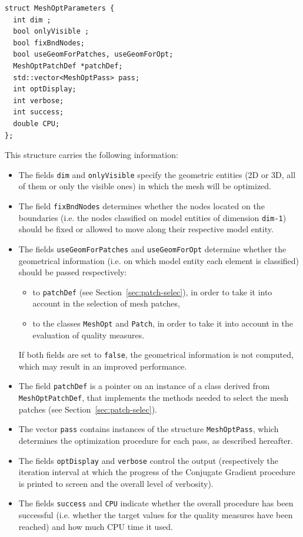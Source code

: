 \documentclass[12pt,a4paper,a4wide]{article}
\begin{document}
\begin{verbatim}
struct MeshOptParameters {
  int dim ;
  bool onlyVisible ;
  bool fixBndNodes;
  bool useGeomForPatches, useGeomForOpt;
  MeshOptPatchDef *patchDef;
  std::vector<MeshOptPass> pass;
  int optDisplay;
  int verbose;
  int success;
  double CPU;
};
\end{verbatim}

This structure carries the following information:
\begin{itemize}
\item The fields \texttt{dim} and \texttt{onlyVisible} specify the
geometric entities (2D or 3D, all of them or only the visible ones)
in which the mesh will be optimized.
\item The field \texttt{fixBndNodes} determines whether the nodes
located on the boundaries (i.e. the nodes classified on model
entities of dimension \texttt{dim-1}) should be fixed or allowed to
move along their respective model entity.
\item The fields \texttt{useGeomForPatches} and \texttt{useGeomForOpt}
determine whether the geometrical information (i.e. on which model
entity each element is classified) should be passed respectively:
\begin{itemize}
\item to \texttt{patchDef} (see Section~\ref{sec:patch-selec}), in
order to take it into account in the selection of mesh patches,
\item to the classes \texttt{MeshOpt} and \texttt{Patch}, in order
to take it into account in the evaluation of quality measures.   
\end{itemize}
If both fields are set to \texttt{false}, the geometrical information
is not computed, which may result in an improved performance.
\item The field \texttt{patchDef} is a pointer on an instance of a
class derived from \texttt{MeshOptPatchDef}, that implements the
methods needed to select the mesh patches (see
Section~\ref{sec:patch-selec}).
\item The vector \texttt{pass} contains instances of the structure
\texttt{MeshOptPass}, which determines the optimization procedure
for each pass, as described hereafter.
\item The fields \texttt{optDisplay} and \texttt{verbose} control
the output (respectively the iteration interval at which the progress
of the Conjugate Gradient procedure is printed to screen and the
overall level of verbosity).
\item The fields \texttt{success} and \texttt{CPU} indicate whether
the overall procedure has been successful (i.e. whether the target
values for the quality measures have been reached) and how much CPU
time it used.
\end{itemize}
\end{document}

